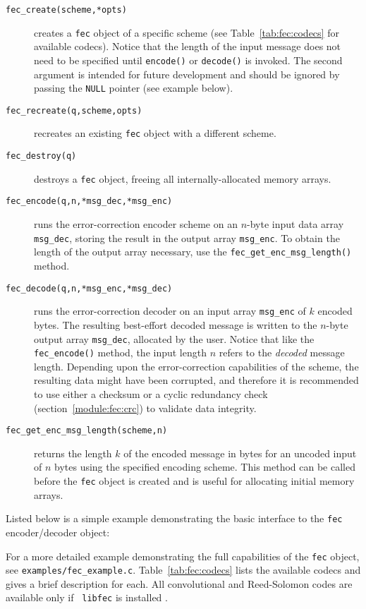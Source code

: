 
\begin{description}
\item[{\tt fec\_create(scheme,*opts)}]
    creates a {\tt fec} object of a specific scheme
    (see Table~\ref{tab:fec:codecs} for available codecs).
    Notice that the length of the input message does not need to be
    specified until {\tt encode()} or {\tt decode()} is invoked.
    The second argument is intended for future development and should be
    ignored by passing the {\tt NULL} pointer
    (see example below).
\item[{\tt fec\_recreate(q,scheme,opts)}]
    recreates an existing {\tt fec} object with a different scheme.
\item[{\tt fec\_destroy(q)}]
    destroys a {\tt fec} object, freeing all internally-allocated memory
    arrays.
\item[{\tt fec\_encode(q,n,*msg\_dec,*msg\_enc)}]
    runs the error-correction encoder scheme on an $n$-byte input data
    array {\tt msg\_dec}, storing the result in the output array
    {\tt msg\_enc}.
    To obtain the length of the output array necessary, use the
    {\tt fec\_get\_enc\_msg\_length()} method.
\item[{\tt fec\_decode(q,n,*msg\_enc,*msg\_dec)}]
    runs the error-correction decoder on an input array
    {\tt msg\_enc} of $k$ encoded bytes.
    The resulting best-effort decoded message is written to the $n$-byte
    output array {\tt msg\_dec}, allocated by the user.
    Notice that like the {\tt fec\_encode()} method, the input length
    $n$ refers to the {\em decoded} message length.
    Depending upon the error-correction capabilities of the scheme, the
    resulting data might have been corrupted,
    and therefore it is recommended to use either a checksum or a
    cyclic redundancy check (section~\ref{module:fec:crc})
    to validate data integrity.
\item[{\tt fec\_get\_enc\_msg\_length(scheme,n)}]
    returns the length $k$ of the encoded message in bytes
    for an uncoded input of $n$ bytes using the specified encoding
    scheme.
    This method can be called before the {\tt fec} object is created and
    is useful for allocating initial memory arrays.
\end{description}
%
Listed below is a simple example demonstrating the basic interface to
the {\tt fec} encoder/decoder object:
%

%
For a more detailed example demonstrating the full capabilities of the
{\tt fec} object, see {\tt examples/fec\_example.c}.
%
Table~\ref{tab:fec:codecs} lists the available codecs and gives a brief
description for each.
All convolutional and Reed-Solomon codes are available only if {\tt
libfec} is installed \cite{libfec:web}.

